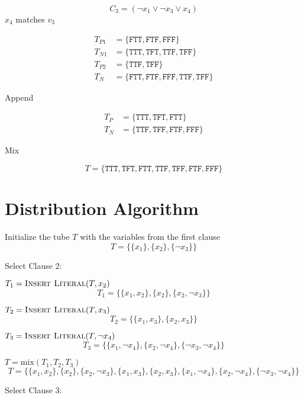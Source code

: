 \[
C_3 = (\neg x_1 \vee \neg x_3 \vee x_4)
\]
\noindent $x_4$ matches $v_3$

\begin{align*}
T_{P1} &= \{\texttt{FTT}, \texttt{FTF}, \texttt{FFF}\}\\
T_{N1} &= \{\texttt{TTT}, \texttt{TFT}, \texttt{TTF}, \texttt{TFF}\}\\
T_{P2} &= \{\texttt{TTF}, \texttt{TFF}\}\\
T_N &= \{\texttt{FTT}, \texttt{FTF}, \texttt{FFF}, \texttt{TTF}, \texttt{TFF}\}
\end{align*}

\noindent Append

\begin{align*}
T_P &= \{\texttt{TTT}, \texttt{TFT}, \texttt{FTT}\}\\
T_N &= \{\texttt{TTF}, \texttt{TFF}, \texttt{FTF}, \texttt{FFF}\}
\end{align*}

\noindent Mix

\[
T = \{\texttt{TTT}, \texttt{TFT}, \texttt{FTT}, \texttt{TTF}, \texttt{TFF}, \texttt{FTF}, \texttt{FFF}\}
\]


\section{Distribution Algorithm}

Initialize the tube $T$ with the variables from the first clause
\[
	T = \{\{x_1\}, \{x_2\}, \{\neg x_3\}\}
\]	

\noindent Select Clause 2:

\par $T_1 =	\text{{\sc Insert Literal}}(T, x_2)$
\[
		T_1 =  \{\{x_1,x_2\}, \{x_2\}, \{x_2,\neg x_3\}\}
\]
\par $T_2 =	\text{{\sc Insert Literal}}(T, x_3)$
\[	
		T_2 =  \{\{x_1,x_3\}, \{x_2,x_3\}\}	
\]
\par $T_3 =	\text{{\sc Insert Literal}}(T, \neg x_4)$
\[	
		T_3 =  \{\{x_1,\neg x_4\}, \{x_2,\neg x_4\}, \{\neg x_3,\neg x_4\}\}			
\]		
\par $T = \text{mix}(T_1, T_2, T_3)$
\[	
		T = \{\{x_1,x_2\}, \{x_2\}, \{x_2,\neg x_3\}, \{x_1, x_3\}, \{x_2,x_3\}, \{x_1,\neg x_4\}, \{x_2,\neg x_4\}, \{\neg x_3,\neg x_4\}\}
\]		

\noindent Select Clause 3:
	
